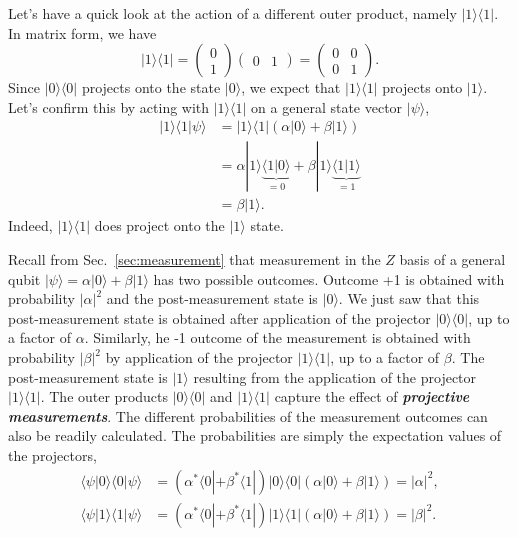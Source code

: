 Let's have a quick look at the action of a different outer product, namely $|1\rangle\langle1|$.
In matrix form, we have
\begin{equation}
    |1\rangle\langle1| = \begin{pmatrix} 0 \\ 1 \end{pmatrix} \begin{pmatrix} 0 & 1 \end{pmatrix} = \begin{pmatrix} 0 & 0  \\ 0 & 1 \end{pmatrix}.
\end{equation}
Since $|0\rangle\langle0|$ projects onto the state $|0\rangle$, we expect that $|1\rangle\langle1|$ projects onto $|1\rangle$.
Let's confirm this by acting with $|1\rangle\langle1|$ on a general state vector $|\psi\rangle$,
\begin{align}
    |1\rangle\langle1|\psi\rangle & = |1\rangle\langle1| \left( \alpha|0\rangle + \beta|1\rangle \right) \label{eq:projector_11}\\
    & = \alpha |1\rangle\underbrace{\langle1|0\rangle}_{=0} + \beta |1\rangle\underbrace{\langle1|1\rangle}_{=1} \nonumber\\
    & = \beta|1\rangle. \nonumber
\end{align}
Indeed, $|1\rangle\langle1|$ does project onto the $|1\rangle$ state.

Recall from Sec.~\ref{sec:measurement} that measurement in the $Z$ basis of a general qubit $|\psi\rangle = \alpha |0\rangle + \beta |1\rangle$ has two possible outcomes.
Outcome +1 is obtained with probability $|\alpha|^2$ and the post-measurement state is $|0\rangle$.
We just saw that this post-measurement state is obtained after application of the projector $|0\rangle\langle0|$, up to a factor of $\alpha$.
Similarly, he -1 outcome of the measurement is obtained with probability $|\beta|^2$ by application of the projector $|1\rangle\langle1|$, up to a factor of $\beta$.
The post-measurement state is $|1\rangle$ resulting from the application of the projector $|1\rangle\langle1|$.
The outer products $|0\rangle\langle0|$ and $|1\rangle\langle1|$ capture the effect of \textbf{\emph{projective measurements}}.
The different probabilities of the measurement outcomes can also be readily calculated.
The probabilities are simply the expectation values of the projectors,
\begin{align}
    \langle \psi | 0 \rangle \langle 0 | \psi \rangle & = \left( \alpha^*\langle0| + \beta^*\langle1| \right) |0\rangle\langle0| \left( \alpha |0\rangle + \beta |1\rangle \right) = |\alpha|^2, \\
    \langle \psi | 1 \rangle \langle 1 | \psi \rangle & = \left( \alpha^*\langle0| + \beta^*\langle1| \right) |1\rangle\langle1| \left( \alpha |0\rangle + \beta |1\rangle \right) = |\beta|^2.
\end{align}

